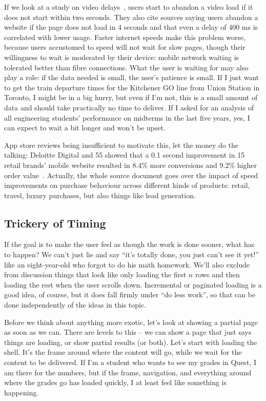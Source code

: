 If we look at a study on video delays~\cite{videoquality}, users start to abandon a video load if it does not start within two seconds. They also cite sources saying users abandon a website if the page does not load in 4 seconds and that even a delay of 400 ms is correlated with lower usage. Faster internet speeds make this problem worse, because users accustomed to speed will not wait for slow pages, though their willingness to wait is moderated by their device: mobile network waiting is tolerated better than fibre connections. What the user is waiting for may also play a role: if the data needed is small, the user's patience is small. If I just want to get the train departure times for the Kitchener GO line from Union Station in Toronto, I might be in a big hurry, but even if I'm not, this is a small amount of data and should take practically no time to deliver. If I asked for an analysis of all engineering students' performance on midterms in the last five years, yes, I can expect to wait a bit longer and won't be upset.

App store reviews being insufficient to motivate this, let the money do the talking: Deloitte Digital and 55 showed that a 0.1 second improvement in 15 retail brands' mobile website resulted in 8.4\% more conversions and 9.2\% higher order value~\cite{deloitte20}. Actually, the whole source document goes over the impact of speed improvements on purchase behaviour across different kinds of products: retail, travel, luxury purchases, but also things like lead generation. 



\subsection*{Trickery of Timing}
If the goal is to make the user feel as though the work is done sooner, what has to happen? We can't just lie and say ``it's totally done, you just can't see it yet!'' like an eight-year-old who forgot to do his math homework. We'll also exclude from discussion things that look like only loading the first $n$ rows and then loading the rest when the user scrolls down. Incremental or paginated loading is a good idea, of course, but it does fall firmly under ``do less work'', so that can be done independently of the ideas in this topic.

Before we think about anything more exotic, let's look at showing a partial page as soon as we can. There are levels to this -- we can show a page that just says things are loading, or show partial results (or both). Let's start with loading the shell. It's the frame around where the content will go, while we wait for the content to be delivered. If I'm a student who wants to see my grades in Quest, I am there for the numbers, but if the frame, navigation, and everything around where the grades go has loaded quickly, I at least feel like something is happening. 

